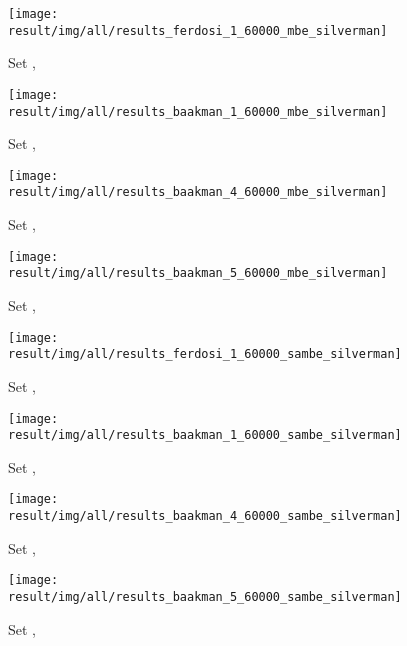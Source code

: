 
\begin{subfigure}{0.23\textwidth}
	\centering
	\texttt{[image: result/img/all/results\_ferdosi\_1\_60000\_mbe\_silverman]}
	\caption{Set \ferdosiOne, \mbe}
	\label{fig:results:singlesphere:mbe:ferdosi1}
\end{subfigure}
\begin{subfigure}{0.23\textwidth}
	\centering
	\texttt{[image: result/img/all/results\_baakman\_1\_60000\_mbe\_silverman]}
	\caption{Set \baakmanOne, \mbe}
	\label{fig:results:singlesphere:mbe:baakman1}
\end{subfigure}
\begin{subfigure}{0.23\textwidth}
	\centering
	\texttt{[image: result/img/all/results\_baakman\_4\_60000\_mbe\_silverman]}
	\caption{Set \baakmanFour, \mbe}
	\label{fig:results:singlesphere:mbe:baakman4}
\end{subfigure}	
\begin{subfigure}{0.23\textwidth}
	\centering
	\texttt{[image: result/img/all/results\_baakman\_5\_60000\_mbe\_silverman]}
	\caption{Set \baakmanFive, \mbe}
	\label{fig:results:singlesphere:mbe:baakman5}
\end{subfigure}
\begin{subfigure}{0.23\textwidth}
	\centering
	\texttt{[image: result/img/all/results\_ferdosi\_1\_60000\_sambe\_silverman]}
	\caption{Set \ferdosiOne, \sambe}
	\label{fig:results:singlesphere:sambe:ferdosi1}
\end{subfigure}
\begin{subfigure}{0.23\textwidth}
	\centering
	\texttt{[image: result/img/all/results\_baakman\_1\_60000\_sambe\_silverman]}
	\caption{Set \baakmanOne, \sambe}
	\label{fig:results:singlesphere:sambe:baakman1}
\end{subfigure}
\begin{subfigure}{0.23\textwidth}
	\centering
	\texttt{[image: result/img/all/results\_baakman\_4\_60000\_sambe\_silverman]}
	\caption{Set \baakmanFour, \sambe}
	\label{fig:results:singlesphere:sambe:baakman4}
\end{subfigure}		
\begin{subfigure}{0.23\textwidth}
	\centering
	\texttt{[image: result/img/all/results\_baakman\_5\_60000\_sambe\_silverman]}
	\caption{Set \baakmanFive, \sambe}
	\label{fig:results:singlesphere:sambe:baakman5}
\end{subfigure}	